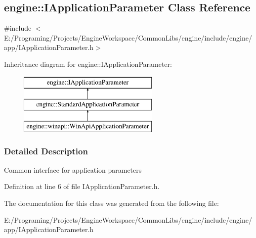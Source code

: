 \hypertarget{a00043}{}\subsection{engine\+:\+:I\+Application\+Parameter Class Reference}
\label{a00043}


{\ttfamily \#include $<$E\+:/\+Programing/\+Projects/\+Engine\+Workspace/\+Common\+Libs/engine/include/engine/app/\+I\+Application\+Parameter.\+h$>$}

Inheritance diagram for engine\+:\+:I\+Application\+Parameter\+:\begin{figure}[H]
\begin{center}
\leavevmode
\includegraphics[height=3.000000cm]{a00043}
\end{center}
\end{figure}


\subsubsection{Detailed Description}
Common interface for application parameters 

Definition at line 6 of file I\+Application\+Parameter.\+h.



The documentation for this class was generated from the following file\+:\begin{DoxyCompactItemize}
\item 
E\+:/\+Programing/\+Projects/\+Engine\+Workspace/\+Common\+Libs/engine/include/engine/app/I\+Application\+Parameter.\+h\end{DoxyCompactItemize}
